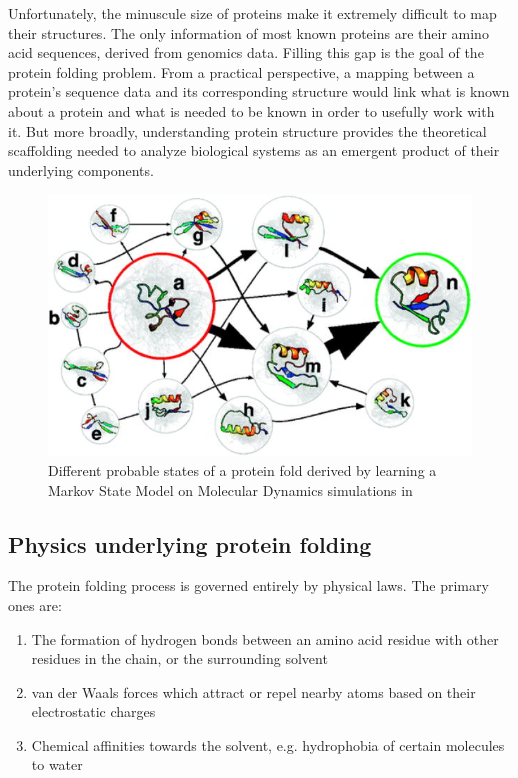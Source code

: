 \documentclass{article}
\begin{document}
Unfortunately, the minuscule size of proteins make it extremely difficult to map their structures. The only information of most known proteins are their amino acid sequences, derived from genomics data. Filling this gap is the goal of the protein folding problem. From a practical perspective, a mapping between a protein's sequence data and its corresponding structure would link what is known about a protein and what is needed to be known in order to usefully work with it. But more broadly, understanding protein structure provides the theoretical scaffolding needed to analyze biological systems as an emergent product of their underlying components.

\begin{figure}[ht]
  \includegraphics[width=\linewidth]{images/folding_pathways.jpg}
  \caption{Different probable states of a protein fold derived by learning a Markov State Model on Molecular Dynamics simulations in \cite{pande2010}}
  \label{fig:folding_pathways}
\end{figure}

\subsection{Physics underlying protein folding}
The protein folding process is governed entirely by physical laws. The primary ones are:

\begin{enumerate}
    \item The formation of hydrogen bonds between an amino acid residue with other residues in the chain, or the surrounding solvent
    \item van der Waals forces which attract or repel nearby atoms based on their electrostatic charges
    \item Chemical affinities towards the solvent, e.g. hydrophobia of certain molecules to water
\end{enumerate}
\end{document}
